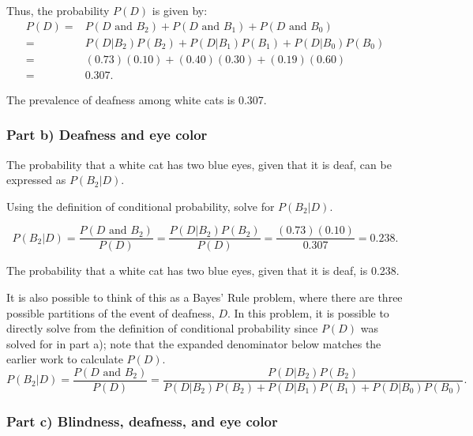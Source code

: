 Thus, the probability $P(D)$ is given by:
\begin{align*}
P(D) =& P(D \textrm{ and } B_2 ) + P(D \textrm{ and } B_1 ) + P(D \textrm{ and } B_0 ) \\
=& P(D|B_2)P(B_2) + P(D|B_1)P(B_1) + P(D|B_0)P(B_0) \\
=& (0.73)(0.10) + (0.40)(0.30) + (0.19)(0.60) \\
=& 0.307.
\end{align*}

The prevalence of deafness among white cats is 0.307.


\textD{\newpage}


\subsubsection{Part b) Deafness and eye color}

The probability that a white cat has two blue eyes, given that it is deaf, can be expressed as $P(B_2|D)$. 

\begin{examplewrap}
\begin{nexample}{Using the definition of conditional probability, solve for $P(B_2|D)$.}
	
\[P(B_2|D) = \dfrac{P(D \textrm{ and } B_2)}{P(D)} = \dfrac{P(D|B_2)P(B_2)}{P(D)} = \dfrac{(0.73)(0.10)}{0.307} = 0.238. \]

The probability that a white cat has two blue eyes, given that it is deaf, is 0.238.
\end{nexample}
\end{examplewrap}

It is also possible to think of this as a Bayes' Rule problem, where there are three possible partitions of the event of deafness, $D$. In this problem, it is possible to directly solve from the definition of conditional probability since $P(D)$  was solved for in part a); note that the expanded denominator below matches the earlier work to calculate $P(D)$.
\[P(B_2|D) = \dfrac{P(D \textrm{ and } B_2)}{P(D)} = \dfrac{P(D|B_2)P(B_2)}{P(D|B_2)P(B_2) + P(D|B_1)P(B_1) + P(D|B_0)P(B_0)}. \]


\subsubsection{Part c) Blindness, deafness, and eye color}

